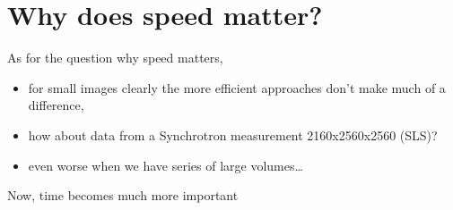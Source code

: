 \documentclass[letterpaper,10pt,english]{sphinxmanual}
\begin{document}
\noindent{}


\section{Why does speed matter?}
\label{\detokenize{06-AdvancedShapeAndTexture:why-does-speed-matter}}
\sphinxAtStartPar
As for the question why speed matters,
\begin{itemize}
\item {} 
\sphinxAtStartPar
for small images clearly the more efficient approaches don’t make much of a difference,

\item {} 
\sphinxAtStartPar
how about data from a Synchrotron measurement 2160x2560x2560 (SLS)?

\item {} 
\sphinxAtStartPar
even worse when we have series of large volumes…

\end{itemize}

\sphinxAtStartPar
Now, time becomes much more important
\end{document}

